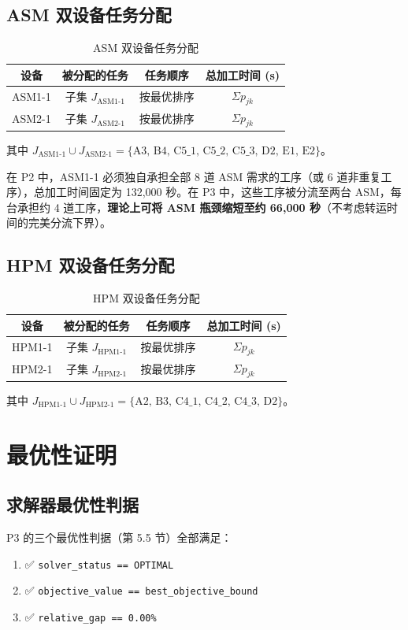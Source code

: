 \documentclass[UTF8,a4paper,12pt]{ctexart}
\begin{document}
\subsection{ASM 双设备任务分配}
\begin{table}[htbp]
  \centering
  \caption{ASM 双设备任务分配}
  \label{tab:asm_alloc}
  \begin{tabular}{cccc}
    \toprule
    设备 & 被分配的任务 & 任务顺序 & 总加工时间 (s) \\
    \midrule
    ASM1-1 & 子集 $J_{\text{ASM1-1}}$ & 按最优排序 & $\Sigma p_{jk}$ \\
    ASM2-1 & 子集 $J_{\text{ASM2-1}}$ & 按最优排序 & $\Sigma p_{jk}$ \\
    \bottomrule
  \end{tabular}
\end{table}

其中 $J_{\text{ASM1-1}} \cup J_{\text{ASM2-1}} = \{\text{A3, B4, C5\_1, C5\_2, C5\_3, D2, E1, E2}\}$。

在 P2 中，ASM1-1 必须独自承担全部 8 道 ASM 需求的工序（或 6 道非重复工序），总加工时间固定为 132,000 秒。在 P3 中，这些工序被分流至两台 ASM，每台承担约 4 道工序，\textbf{理论上可将 ASM 瓶颈缩短至约 66,000 秒}（不考虑转运时间的完美分流下界）。

\subsection{HPM 双设备任务分配}
\begin{table}[htbp]
  \centering
  \caption{HPM 双设备任务分配}
  \label{tab:hpm_alloc}
  \begin{tabular}{cccc}
    \toprule
    设备 & 被分配的任务 & 任务顺序 & 总加工时间 (s) \\
    \midrule
    HPM1-1 & 子集 $J_{\text{HPM1-1}}$ & 按最优排序 & $\Sigma p_{jk}$ \\
    HPM2-1 & 子集 $J_{\text{HPM2-1}}$ & 按最优排序 & $\Sigma p_{jk}$ \\
    \bottomrule
  \end{tabular}
\end{table}

其中 $J_{\text{HPM1-1}} \cup J_{\text{HPM2-1}} = \{\text{A2, B3, C4\_1, C4\_2, C4\_3, D2}\}$。

\section{最优性证明}
\subsection{求解器最优性判据}
P3 的三个最优性判据（第 5.5 节）全部满足：
\begin{enumerate}
  \item ✅ \texttt{solver\_status == OPTIMAL}
  \item ✅ \texttt{objective\_value == best\_objective\_bound}
  \item ✅ \texttt{relative\_gap == 0.00\%}
\end{enumerate}
\end{document}
